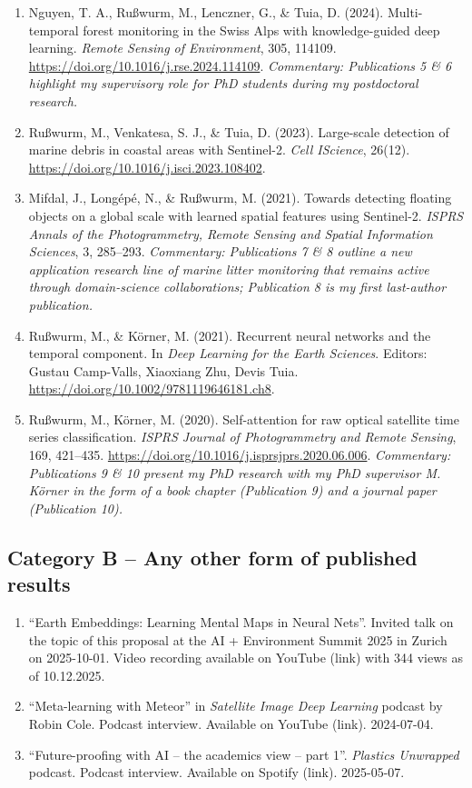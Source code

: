 \documentclass{scrartcl}
\begin{document}
\begin{enumerate}
    \item Nguyen, T. A., Ru\ss{}wurm, M., Lenczner, G., \& Tuia, D. (2024). Multi-temporal forest monitoring in the Swiss Alps with knowledge-guided deep learning. \textit{Remote Sensing of Environment}, 305, 114109. \url{https://doi.org/10.1016/j.rse.2024.114109}. \textit{Commentary: Publications 5 \& 6 highlight my supervisory role for PhD students during my postdoctoral research.}
    \item Ru\ss{}wurm, M., Venkatesa, S. J., \& Tuia, D. (2023). Large-scale detection of marine debris in coastal areas with Sentinel-2. \textit{Cell IScience}, 26(12). \url{https://doi.org/10.1016/j.isci.2023.108402}.
    \item Mifdal, J., Long\'ep\'e, N., \& Ru\ss{}wurm, M. (2021). Towards detecting floating objects on a global scale with learned spatial features using Sentinel-2. \textit{ISPRS Annals of the Photogrammetry, Remote Sensing and Spatial Information Sciences}, 3, 285--293. \textit{Commentary: Publications 7 \& 8 outline a new application research line of marine litter monitoring that remains active through domain-science collaborations; Publication 8 is my first last-author publication.}
    \item Ru\ss{}wurm, M., \& K\"orner, M. (2021). Recurrent neural networks and the temporal component. In \textit{Deep Learning for the Earth Sciences}. Editors: Gustau Camp-Valls, Xiaoxiang Zhu, Devis Tuia. \url{https://doi.org/10.1002/9781119646181.ch8}.
    \item Ru\ss{}wurm, M., K\"orner, M. (2020). Self-attention for raw optical satellite time series classification. \textit{ISPRS Journal of Photogrammetry and Remote Sensing}, 169, 421--435. \url{https://doi.org/10.1016/j.isprsjprs.2020.06.006}. \textit{Commentary: Publications 9 \& 10 present my PhD research with my PhD supervisor M. K\"orner in the form of a book chapter (Publication 9) and a journal paper (Publication 10).}
\end{enumerate}

\subsection*{Category B -- Any other form of published results}
\begin{enumerate}
    \item ``Earth Embeddings: Learning Mental Maps in Neural Nets''. Invited talk on the topic of this proposal at the AI + Environment Summit 2025 in Zurich on 2025-10-01. Video recording available on YouTube (link) with 344 views as of 10.12.2025.
    \item ``Meta-learning with Meteor'' in \textit{Satellite Image Deep Learning} podcast by Robin Cole. Podcast interview. Available on YouTube (link). 2024-07-04.
    \item ``Future-proofing with AI -- the academics view -- part 1''. \textit{Plastics Unwrapped} podcast. Podcast interview. Available on Spotify (link). 2025-05-07.
\end{enumerate}
\end{document}
